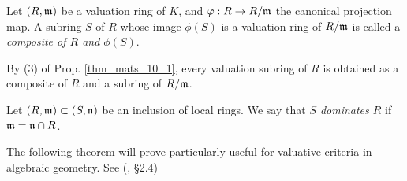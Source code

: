 \begin{defn}
Let $(R, \mathfrak{m})$ be a valuation ring of $K$, and $\varphi: R \to 
R/\mathfrak{m}$ the canonical projection map. A subring $S$ of $R$ whose
image $\phi(S)$ is a valuation ring of $R/\mathfrak{m}$ is called a
\emph{composite of $R$ and $\phi(S)$}.
\end{defn}

\begin{rmk}
By (3) of Prop. \ref{thm_mats_10_1}, every valuation subring of
$R$ is obtained as a composite of $R$ and a subring of 
$R/\mathfrak{m}$. 
\end{rmk}

\begin{defn}\label{defn_dominates}
Let $(R, \mathfrak{m}) \subset (S, \mathfrak{n})$ be an inclusion of 
local rings. We say that \emph{$S$ dominates $R$} if $\mathfrak{m} = 
\mathfrak{n} \cap R$.
\end{defn}

The following theorem will prove particularly useful for valuative 
criteria in algebraic geometry. See (\cite{Hart}, \S 2.4)


